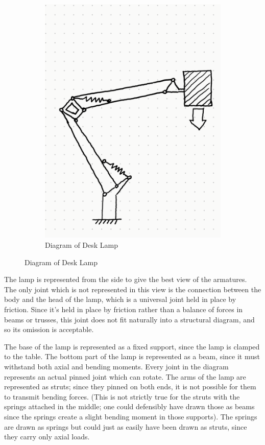 \documentclass[
]{article}
\begin{document}
\begin{figure}
\begin{subfigure}[b]{0.45\textwidth}
    \includegraphics[width=\textwidth,height=\textheight]{Images/A1_Lamp_Diagram.png}
    \caption{Diagram of Desk Lamp}
    \end{subfigure}
\end{figure}

The lamp is represented from the side to give the best view of the
armatures. The only joint which is not represented in this view is the
connection between the body and the head of the lamp, which is a
universal joint held in place by friction. Since it's held in place by
friction rather than a balance of forces in beams or trusses, this joint
does not fit naturally into a structural diagram, and so its omission is
acceptable.

The base of the lamp is represented as a fixed support, since the lamp
is clamped to the table. The bottom part of the lamp is represented as a
beam, since it must withstand both axial and bending moments. Every
joint in the diagram represents an actual pinned joint which can rotate.
The arms of the lamp are represented as struts; since they pinned on
both ends, it is not possible for them to transmit bending forces. (This
is not strictly true for the struts with the springs attached in the
middle; one could defensibly have drawn those as beams since the springs
create a slight bending moment in those supports). The springs are drawn
as springs but could just as easily have been drawn as struts, since
they carry only axial loads.
\end{document}
